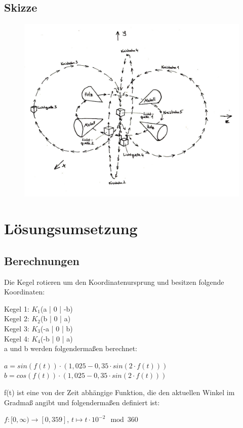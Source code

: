\documentclass{scrartcl}
\begin{document}
        \subsection{Skizze}
            \begin{figure}[!htb]
            \centering
            \includegraphics{skizze.jpeg}
        \end{figure}
        \newpage

    \section{Lösungsumsetzung}
        \subsection{Berechnungen}
            Die Kegel rotieren um den Koordinatenursprung und besitzen folgende Koordinaten: \par
            Kegel 1: $K_{1}$(a | 0 | -b) \\
            Kegel 2: $K_{2}$(b | 0 | a) \\
            Kegel 3: $K_{3}$(-a | 0 | b) \\
            Kegel 4: $K_{4}$(-b | 0 | a) \\
             
            a und b werden folgendermaßen berechnet:
            \begin{center}
            $a = sin(f(t))\cdot (1,025-0,35\cdot sin(2\cdot f(t)))$ \\
            $b = cos(f(t))\cdot (1,025-0,35\cdot sin(2\cdot f(t)))$ \\
            \end{center}
            f(t) ist eine von der Zeit abhängige Funktion, die den aktuellen Winkel im Gradmaß angibt und folgendermaßen definiert ist:
            \begin{center}
            $f:[0, \infty)\rightarrow [0,359]$, $t\mapsto t\cdot 10^{-2} \mod 360$ 
            \end{center}
\end{document}
